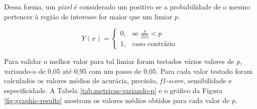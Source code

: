 Dessa forma, um \textit{pixel} é considerado um positivo se a probabilidade de o mesmo pertencer à região de interesse for maior que um limiar $p$.

\begin{equation}
Y(x) = \left \{ \begin{matrix} 0, & \mbox{se } \frac{x}{255} < p
\\ 1, & \mbox{caso contrário} \end{matrix} \right. 
\label{eq-prob-threshold}
\end{equation}

Para validar o melhor valor para tal limiar foram testados vários valores de $p$, variando-o de 0,05 até 0,95 com um passo de 0,05. Para cada valor testado foram calculados os valores médios de acurácia, precisão, \textit{f1-score}, sensibilidade e especificidade. A Tabela \ref{tab:metricas-variando-p} e o gráfico da Figura \ref{fig:graphic-results} mostram os valores médios obtidos para cada valor de $p$.

